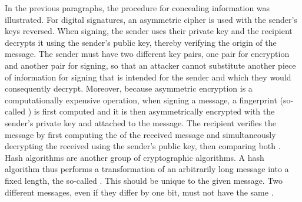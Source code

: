 In the previous paragraphs, the procedure for concealing information was illustrated.
For digital signatures, an asymmetric cipher is used with the sender's keys reversed.
When signing, the sender uses their private key and the recipient decrypts it
using the sender's public key, thereby verifying the origin of the message.
The sender must have two different key pairs, one pair for encryption
and another pair for signing, so that an attacker cannot substitute another piece of information for signing
that is intended for the sender and which they would consequently decrypt.
Moreover, because asymmetric encryption is a computationally expensive operation,
when signing a message, a fingerprint (so-called ) is first computed and it
is then asymmetrically encrypted with the sender's private key and attached to the message.
The recipient verifies the message by first computing the  of the received message
and simultaneously decrypting the received  using the sender's public key,
then comparing both .
Hash algorithms are another group of cryptographic algorithms.
A hash algorithm thus performs a transformation of an arbitrarily long message into a fixed
length, the so-called .
This  should be unique to the given message. Two different messages, even if they differ
by one bit, must not have the same .

